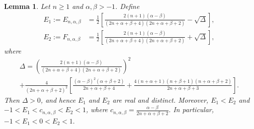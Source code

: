 \documentclass[final,3p,times,12pt]{elsarticle}
\newtheorem{lemma}{Lemma}[section]
\numberwithin{equation}{section}  %
\begin{document}
		\begin{lemma}
		\label{LemmaLocationE1E2}
		Let $n\geq1$ and $\alpha,\beta>-1$. Define
		\begin{align}
			E_1:=E_{n,\alpha,\beta}
			&=
			\frac{1}{2}
			\left[
			\frac{2(n+1)(\alpha-\beta)}
			{(2n+\alpha+\beta+4)(2n+\alpha+\beta+2)}
			-
			\sqrt{\Delta}
			\right],
			\label{eq:E1}\\
			E_2:=F_{n,\alpha,\beta}
			&=
			\frac{1}{2}
			\left[
			\frac{2(n+1)(\alpha-\beta)}
			{(2n+\alpha+\beta+4)(2n+\alpha+\beta+2)}
			+
			\sqrt{\Delta}
			\right],
			\label{eq:E2}
		\end{align}
		where
		\begin{multline}
			\label{eq:Delta}
			\Delta =	\left(
			\frac{2(n+1)(\alpha-\beta)}	{(2n+\alpha+\beta+4)(2n+\alpha+\beta+2)}	\right)^2	\\	+	\frac{4}{(2n+\alpha+\beta+2)^2}	\left[	\frac{(\alpha-\beta)^2(\alpha+\beta+2)}
			{2n+\alpha+\beta+4}	+	\frac{4(n+\alpha+1)(n+\beta+1)(n+\alpha+\beta+2)}
			{2n+\alpha+\beta+3}
			\right].
		\end{multline}
		Then $\Delta>0$, and hence $E_1$ and $E_2$ are real and distinct. Moreover, $	E_1<E_2$ and $-1<E_1<c_{n,\alpha,\beta}<E_2<1$, where 
		$\displaystyle{c_{n,\alpha,\beta}
			=
			\frac{\alpha-\beta}{2n+\alpha+\beta+2}}.$
		In particular, $-1<E_1<0<E_2<1.$
	\end{lemma}
	
\end{document}
